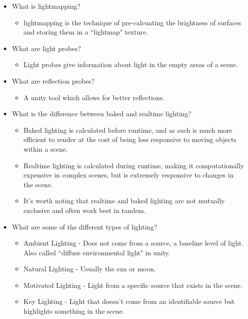 \documentclass{article}
\begin{document}
\begin{itemize}
\begin{itemize}
    \end{itemize}
    \item What is lightmapping?
    \begin{itemize}
        \item lightmapping is the technique of pre-calcuating the brightness of surfaces and storing them in a ``lightmap" texture.
    \end{itemize}
    \item What are light probes?
    \begin{itemize}
        \item Light probes give information about light in the empty areas of a scene.
    \end{itemize}
    \item What are reflection probes?
    \begin{itemize}
        \item A unity tool which allows for better reflections.
    \end{itemize}
    \item What is the difference between baked and realtime lighting?
    \begin{itemize}
        \item Baked lighting is calculated before runtime, and as such is much more efficient to render at the cost of being less responsive to moving objects within a scene.
        \item Realtime lighting is calculated during runtime, making it computationally expensive in complex scenes, but is extremely responsive to changes in the scene.
        \item It's worth noting that realtime and baked lighting are not mutually exclusive and often work best in tandem.
    \end{itemize}
    \item What are some of the different types of lighting?
    \begin{itemize}
        \item Ambient Lighting - Does not come from a source, a baseline level of light. Also called ``diffuse environmental light" in unity.
        \item Natural Lighting - Usually the sun or moon.
        \item Motivated Lighting - Light from a specific source that exists in the scene.
        \item Key Lighting - Light that doesn't come from an identifiable source but highlights something in the scene.
    \end{itemize}

\end{itemize}
\end{document}
